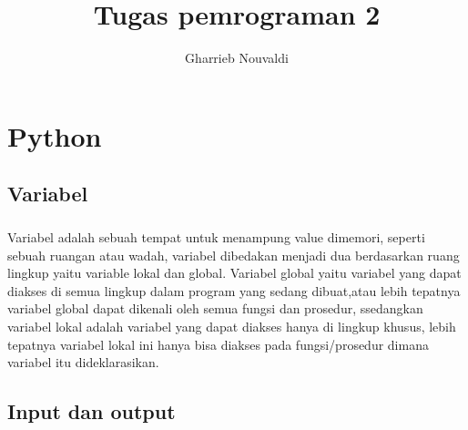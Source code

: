 \documentclass[a4paper,12pt]{report}
\title{Tugas pemrograman 2}
\author{Gharrieb Nouvaldi}
\begin{document}
\maketitle
\chapter{Python}
\section{Variabel}
\paragraph{}
Variabel adalah sebuah tempat untuk menampung value dimemori, seperti sebuah ruangan atau wadah,  variabel dibedakan menjadi dua berdasarkan ruang lingkup yaitu variable lokal dan global. Variabel global yaitu variabel yang dapat diakses di semua lingkup  dalam program yang sedang dibuat,atau lebih tepatnya variabel global dapat dikenali oleh semua fungsi dan prosedur, ssedangkan variabel lokal adalah variabel yang dapat diakses hanya di lingkup khusus, lebih tepatnya variabel lokal ini hanya bisa diakses pada fungsi/prosedur dimana variabel itu dideklarasikan.
\section{Input dan output}
\end{document}

